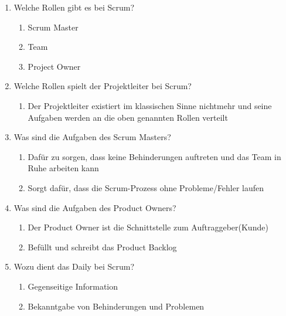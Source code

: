\documentclass[12pt,a4paper]{article}
\begin{document}
\begin{enumerate}
\begin{enumerate}
	\end{enumerate}
	\item Welche Rollen gibt es bei Scrum?
	\begin{enumerate}
		\item Scrum Master
		\item Team 
		\item Project Owner
	\end{enumerate}
	\item Welche Rollen spielt der Projektleiter bei Scrum?
	\begin{enumerate}
		\item Der Projektleiter existiert im klassischen Sinne nichtmehr und seine Aufgaben werden an die oben genannten Rollen verteilt
	\end{enumerate}
	\item Was sind die Aufgaben des Scrum Masters?
	\begin{enumerate}
		\item Dafür zu sorgen, dass keine Behinderungen auftreten und das Team in Ruhe arbeiten kann
		\item Sorgt dafür, dass die Scrum-Prozess ohne Probleme/Fehler laufen
	\end{enumerate}
	\item Was sind die Aufgaben des Product Owners?
	\begin{enumerate}
		\item Der Product Owner ist die Schnittstelle zum Auftraggeber(Kunde)
		\item Befüllt und schreibt das Product Backlog
	\end{enumerate}
	\item Wozu dient das Daily bei Scrum?
	\begin{enumerate}
		\item Gegenseitige Information
		\item Bekanntgabe von Behinderungen und Problemen
	\end{enumerate}
\end{enumerate}
\end{document}
